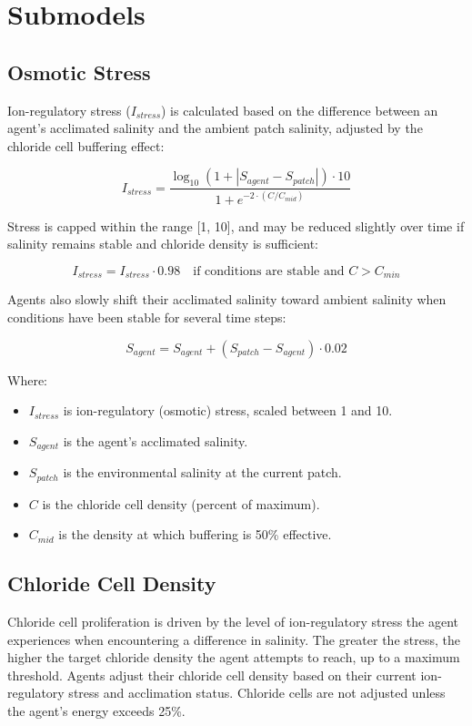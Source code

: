 \documentclass[
]{book}
\providecommand{\tightlist}{%
  \setlength{\itemsep}{0pt}\setlength{\parskip}{0pt}}
\begin{document}
\section{Submodels}\label{submodels}

\subsection{Osmotic Stress}\label{osmotic-stress}

Ion-regulatory stress (\(I_{stress}\)) is calculated based on the difference between an agent's acclimated salinity and the ambient patch salinity, adjusted by the chloride cell buffering effect:

\[
I_{stress} = \frac{\log_{10}(1 + |S_{agent} - S_{patch}|) \cdot 10}{1 + e^{-2 \cdot (C / C_{mid})}}
\]

Stress is capped within the range {[}1, 10{]}, and may be reduced slightly over time if salinity remains stable and chloride density is sufficient:

\[
I_{stress} = I_{stress} \cdot 0.98 \quad \text{if conditions are stable and } C > C_{min}
\]

Agents also slowly shift their acclimated salinity toward ambient salinity when conditions have been stable for several time steps:

\[
S_{agent} = S_{agent} + (S_{patch} - S_{agent}) \cdot 0.02
\]

Where:

\begin{itemize}
\tightlist
\item
  \(I_{stress}\) is ion-regulatory (osmotic) stress, scaled between 1 and 10.
\item
  \(S_{agent}\) is the agent's acclimated salinity.
\item
  \(S_{patch}\) is the environmental salinity at the current patch.
\item
  \(C\) is the chloride cell density (percent of maximum).
\item
  \(C_{mid}\) is the density at which buffering is 50\% effective.
\end{itemize}

\subsection{Chloride Cell Density}\label{chloride-cell-density}

Chloride cell proliferation is driven by the level of ion-regulatory stress the agent experiences when encountering a difference in salinity.
The greater the stress, the higher the target chloride density the agent attempts to reach, up to a maximum threshold.
Agents adjust their chloride cell density based on their current ion-regulatory stress and acclimation status.
Chloride cells are not adjusted unless the agent's energy exceeds 25\%.
\end{document}
